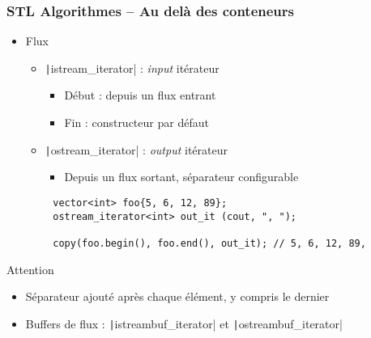 \documentclass[C++.tex]{subfiles}
\begin{document}
\begin{frame}[fragile]
	\frametitle{STL Algorithmes -- Au delà des conteneurs}
	\begin{itemize}
		\item Flux
		\begin{itemize}
			\item \texttt|istream_iterator| : \textit{input} itérateur
			\begin{itemize}
				\item Début : depuis un flux entrant
				\item Fin : constructeur par défaut
			\end{itemize}
			\item \texttt|ostream_iterator| : \textit{output} itérateur
			\begin{itemize}
				\item Depuis un flux sortant, séparateur configurable
			\end{itemize}
		\end{itemize}
	\end{itemize}

	\begin{verbatim}
		vector<int> foo{5, 6, 12, 89};
		ostream_iterator<int> out_it (cout, ", ");

		copy(foo.begin(), foo.end(), out_it); // 5, 6, 12, 89,
	\end{verbatim}

	\begin{alertblock}{Attention}
		\begin{itemize}
			\item Séparateur ajouté après chaque élément, y compris le dernier
		\end{itemize}
	\end{alertblock}

	\begin{itemize}
		\item Buffers de flux : \texttt|istreambuf_iterator| et \texttt|ostreambuf_iterator|
	\end{itemize}


\end{frame}
\end{document}
